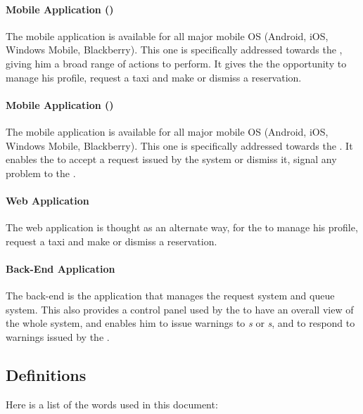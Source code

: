 \paragraph{Mobile Application (\emph{})}
\label{app:mobileuser}
  The mobile application is available for all major mobile OS (Android, iOS, Windows Mobile, Blackberry).
  This one is specifically addressed towards the \emph{}, giving him a broad range of actions to perform.
  It gives the \emph{} the opportunity to manage his profile, request a taxi and make or dismiss a reservation. %

\paragraph{Mobile Application (\emph{})} %
  \label{app:mobiledriver}
  The mobile application is available for all major mobile OS (Android, iOS, Windows Mobile, Blackberry).
  This one is specifically addressed towards the \emph{}.
  It enables the \emph{} to accept a request issued by the system or dismiss it, signal any problem to the \emph{}.

\paragraph{Web Application} %
  \label{app:web}
  The web application is thought as an alternate way, for the \emph{} to manage his profile, request a taxi and make or dismiss a reservation.

\paragraph{Back-End Application} %
  \label{app:backend}
  The back-end is the application that manages the request system and queue system. This also provides a control panel used by the \emph{} to have an overall view of the whole system, and enables him to issue warnings to \emph{s} or \emph{s}, and to respond to warnings issued by the \emph{}.
\subsection{Definitions}
\label{sub:def}
Here is a list of the words used in this document:

